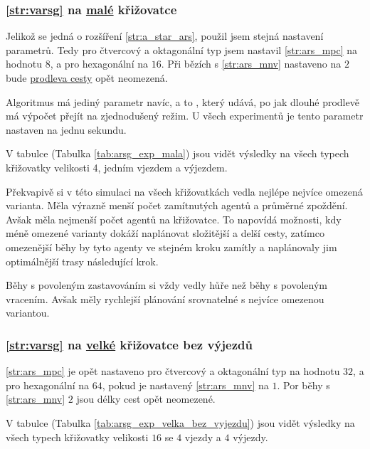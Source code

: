 \subsubsection{\ref{str:varsg} na \hyperref[par:data_mala]{malé} křižovatce}
\label{subsubsec:exp_arsg_mala_krizovatka}

Jelikož se jedná o rozšíření \ref{str:a_star_ars}, použil jsem stejná nastavení parametrů.
Tedy pro čtvercový a oktagonální typ jsem nastavil \ref{str:ars_mpc} na hodnotu $8$, a pro hexagonální na $16$.
Při bězích s \ref{str:ars_mnv} nastaveno na $2$ bude \hyperref[par:ars_mpc]{prodleva cesty} opět neomezená.

Algoritmus má jediný parametr navíc, a to , který udává,
po jak dlouhé prodlevě má výpočet přejít na zjednodušený režim.
U všech experimentů je tento parametr nastaven na jednu sekundu.

V tabulce (Tabulka \ref{tab:arsg_exp_mala}) jsou vidět výsledky na všech typech křižovatky
velikosti 4, jedním vjezdem a výjezdem.

Překvapivě si v této simulaci na všech křižovatkách vedla nejlépe nejvíce omezená varianta.
Měla výrazně menší počet zamítnutých agentů a průměrné zpoždění.
Avšak měla nejmenší počet agentů na křižovatce.
To napovídá možnosti, kdy méně omezené varianty dokáží naplánovat složitější a delší cesty,
zatímco omezenější běhy by tyto agenty ve stejném kroku zamítly a naplánovaly jim optimálnější trasy následující krok.

Běhy s povoleným zastavováním si vždy vedly hůře než běhy s povoleným vracením.
Avšak měly rychlejší plánování srovnatelné s nejvíce omezenou variantou.



\subsubsection{\ref{str:varsg} na \hyperref[par:data_velka]{velké} křižovatce bez výjezdů}
\label{subsubsec:exp_arsg_velka_krizovatka_bez_vyjezdu}

\ref{str:ars_mpc} je opět nastaveno pro čtvercový a oktagonální typ na hodnotu $32$,
a pro hexagonální na $64$, pokud je nastavený \ref{str:ars_mnv} na $1$.
Por běhy s \ref{str:ars_mnv} $2$ jsou délky cest opět neomezené.

V tabulce (Tabulka \ref{tab:arsg_exp_velka_bez_vyjezdu}) jsou vidět výsledky na všech typech křižovatky
velikosti $16$ se $4$ vjezdy a $4$ výjezdy.


